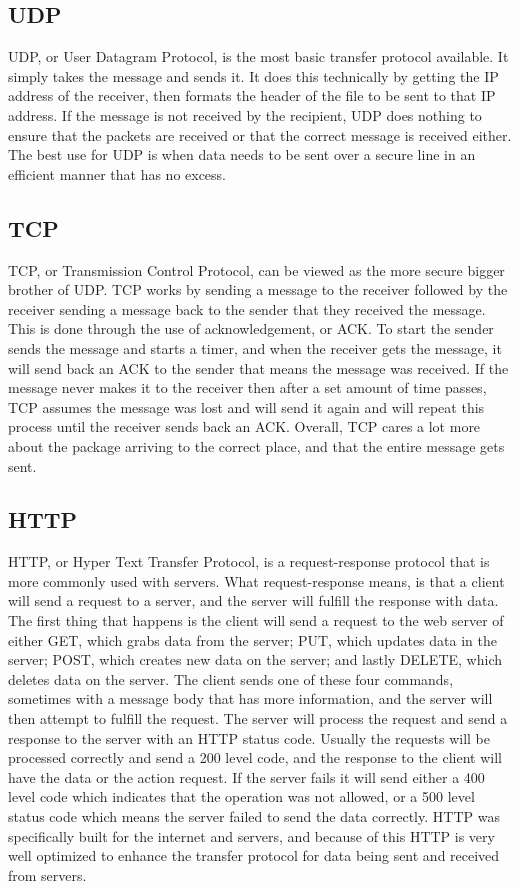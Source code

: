 \documentclass[a4paper, 10pt, draftclsnofoot, onecolumn]{article}
\begin{document}
\subsection*{UDP}
UDP, or User Datagram Protocol, is the most basic transfer protocol available. It simply takes the message and sends it. It does this technically by getting the IP address of the receiver, then formats the header of the file to be sent to that IP address\cite{udp}. If the message is not received by the recipient, UDP does nothing to ensure that the packets are received or that the correct message is received either\cite{udp}. The best use for UDP is when data needs to be sent over a secure line in an efficient manner that has no excess.

\subsection*{TCP}
TCP, or Transmission Control Protocol, can be viewed as the more secure bigger brother of UDP. TCP works by sending a message to the receiver followed by the receiver sending a message back to the sender that they received the message\cite{tcp}. This is done through the use of acknowledgement, or ACK. To start the sender sends the message and starts a timer, and when the receiver gets the message, it will send back an ACK to the sender that means the message was received\cite{tcp}. If the message never makes it to the receiver then after a set amount of time passes, TCP assumes the message was lost and will send it again and will repeat this process until the receiver sends back an ACK\cite{tcp}. Overall, TCP cares a lot more about the package arriving to the correct place, and that the entire message gets sent.

\subsection*{HTTP}
HTTP, or Hyper Text Transfer Protocol, is a request-response protocol that is more commonly used with servers\cite{http}. What request-response means, is that a client will send a request to a server, and the server will fulfill the response with data\cite{http}. The first thing that happens is the client will send a request to the web server of either GET, which grabs data from the server; PUT, which updates data in the server; POST, which creates new data on the server; and lastly DELETE, which deletes data on the server\cite{http}. The client sends one of these four commands, sometimes with a message body that has more information, and the server will then attempt to fulfill the request. The server will process the request and send a response to the server with an HTTP status code. Usually the requests will be processed correctly and send a 200 level code, and the response to the client will have the data or the action request\cite{http}. If the server fails it will send either a 400 level code which indicates that the operation was not allowed, or a 500 level status code which means the server failed to send the data correctly\cite{http}. HTTP was specifically built for the internet and servers, and because of this HTTP is very well optimized to enhance the transfer protocol for data being sent and received from servers.
\end{document}
